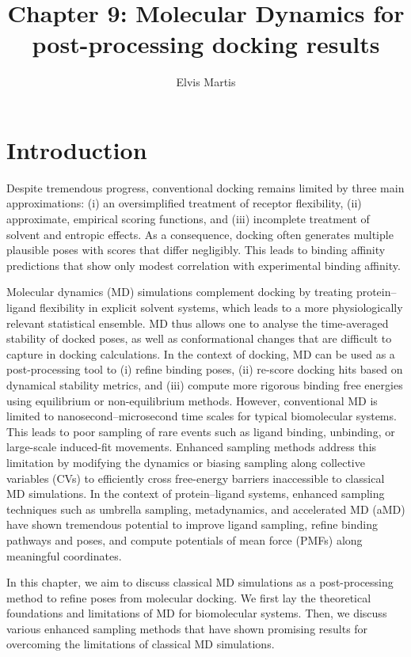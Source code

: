 \documentclass[12pt]{article}
\title{Chapter 9: Molecular Dynamics for post-processing docking results}
\author{Elvis Martis}
\date{}
\begin{document}
\maketitle

\section{Introduction}

 Despite tremendous progress, conventional docking remains limited by three main approximations: (i) an oversimplified treatment of receptor flexibility, (ii) approximate, empirical scoring functions, and (iii) incomplete treatment of solvent and entropic effects\cite{CH9_Warren2006,CH9_Chen2014}. As a consequence, docking often generates multiple plausible poses with scores that differ negligibly. This leads to binding affinity predictions that show only modest correlation with experimental binding affinity.

Molecular dynamics (MD) simulations complement docking by treating protein--ligand flexibility in explicit solvent systems, which leads to a more physiologically relevant statistical ensemble\cite{CH9_McCammon1977,CH9_FrenkelSmit2023,CH9_Hollingsworth2018}. MD thus allows one to analyse the time-averaged stability of docked poses, as well as conformational changes that are difficult to capture in docking calculations. In the context of docking, MD can be used as a post-processing tool to (i) refine binding poses, (ii) re-score docking hits based on dynamical stability metrics, and (iii) compute more rigorous binding free energies using equilibrium\cite{CH9_zuckerman2011equilibrium} or non-equilibrium\cite{CH9_hoover1995non,CH9_ciccotti2016non} methods. However, conventional MD is limited to nanosecond--microsecond time scales for typical biomolecular systems. This leads to poor sampling of rare events such as ligand binding, unbinding, or large-scale induced-fit movements. Enhanced sampling methods address this limitation by modifying the dynamics or biasing sampling along collective variables (CVs) to efficiently cross free-energy barriers inaccessible to classical MD simulations\cite{CH9_Tiwary2015}. In the context of protein--ligand systems, enhanced sampling techniques such as umbrella sampling, metadynamics, and accelerated MD (aMD) have shown tremendous potential to improve ligand sampling, refine binding pathways and poses, and compute potentials of mean force (PMFs) along meaningful coordinates.

In this chapter, we aim to discuss classical MD simulations as a post-processing method to refine poses from molecular docking. We first lay the theoretical foundations and limitations of MD for biomolecular systems. Then, we discuss various enhanced sampling methods that have shown promising results for overcoming the limitations of classical MD simulations. 
\end{document}
